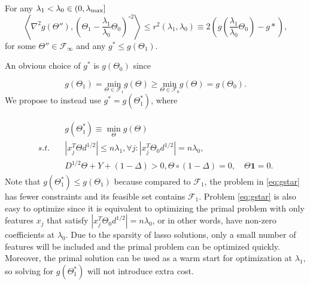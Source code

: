 \begin{theorem}
    \label{thm:1}
    For any $\lambda_1<\lambda_{0}\in (0,\lambda_\textnormal{max}]$ 
    \begin{equation}
        \left\langle\nabla^2 g(\Theta''),\left(\Theta_{1}-\frac{\lambda_1}{\lambda_0}\Theta_{0}\right)^{\circ 2}\right\rangle\leq r^2(\lambda_1,\lambda_0)\equiv 2\left(g\left(\frac{\lambda_1}{\lambda_0}\Theta_{0}\right)-g*\right),
    \end{equation}
    for some $\Theta''\in\mathcal{F}_{\infty}$ and any $g^*\leq g(\Theta_{1})$.
\end{theorem}

An obvious choice of $g^*$ is $g(\Theta_{0})$ since

\begin{equation*}
  g(\Theta_{1}) = \underset{\Theta\in \mathcal{F}_{1}}{\mathrm{min}}g(\Theta)\geq\underset{\Theta\in \mathcal{F}_{0}}{\mathrm{min}}g(\Theta) = g\left(\Theta_{0}\right).
\end{equation*}
We propose to instead use $g^* = g(\Theta^*_{1})$, where

\begin{gather}
    \label{eq:gstar}
    \begin{aligned}
        &g(\Theta^*_{1}) \equiv \min_\Theta g(\Theta)\\
        s.t.\quad &|x_j^T\Theta d^{1/2}|\leq n\lambda_1,\forall j:|x_j^T\Theta_{0} d^{1/2}|= n\lambda_0,\\&D^{1/2}\Theta+Y+(1-\Delta)> 0, \Theta\circ(1-\Delta)=0,\quad \Theta\mathbf{1}=0.
    \end{aligned}
\end{gather}
Note that $g(\Theta^*_{1}) \leq g(\Theta_{1})$ because compared to $\mathcal{F}_{1}$, the problem in \eqref{eq:gstar} has fewer constraints and its feasible set contains $\mathcal{F}_{1}$. Problem \eqref{eq:gstar} is also easy to optimize since it is equivalent to optimizing the primal problem with only features $x_j$ that satisfy $|x_j^T\Theta_{0} d^{1/2}|= n\lambda_0$, or in other words, have non-zero coefficients at $\lambda_0$. Due to the sparsity of lasso solutions, only a small number of features will be included and the primal problem can be optimized quickly. Moreover, the primal solution can be used as a warm start for optimization at $\lambda_1$, so solving for $g(\Theta^*_{1})$ will not introduce extra cost. 

